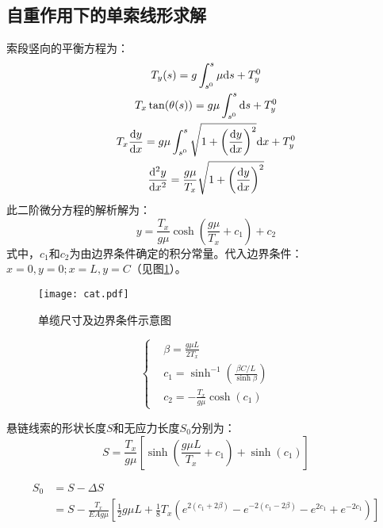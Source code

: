 \subsection{自重作用下的单索线形求解}
索段竖向的平衡方程为：
\begin{gather}
  T_y(s) = g \int_{s^0}^{s} \mu \mathrm{d}s + T_y^0 \notag \\
  T_x \tan(\theta(s)) = g \mu \int_{s^0}^{s} \mathrm{d}s + T_y^0 \notag \\
  T_x \frac{\mathrm{d} y}{\mathrm{d} x} = g \mu \int_{s^0}^{s} \sqrt{1+\left(\frac{\mathrm{d} y}{\mathrm{d} x}\right)^2} \mathrm{d}x + T_y^0 \notag \\
  \frac{\mathrm{d}^2 y}{\mathrm{d} x^2} = \frac{g \mu}{T_x} \sqrt{1+\left(\frac{\mathrm{d} y}{\mathrm{d} x}\right)^2}
\end{gather}
此二阶微分方程的解析解为：
\begin{equation}
  y = \frac{T_x}{g \mu} \cosh \left( \frac{g \mu}{T_x} + c_1 \right)+c_2
\end{equation}
式中，$c_1$和$c_2$为由边界条件确定的积分常量。代入边界条件：$x=0,y=0;x=L,y=C$（见图\ref{fig:cat}）。

\begin{figure}[!htpb]
\centering
\texttt{[image: cat.pdf]}
\caption{单缆尺寸及边界条件示意图}
\label{fig:cat}
\end{figure}

\begin{equation}
  \left \{
    \begin{split}
      & \beta = \frac{g \mu L}{2 T_x}\\
      & c_1 = \sinh^{-1}\left(\frac{\beta C / L}{\sinh \beta}\right)\\
      & c_2 = -\frac{T_x}{g \mu} \cosh(c_1)
    \end{split}
  \right.
\end{equation}

悬链线索的形状长度$S$和无应力长度$S_0$分别为：
\begin{equation}
  S = \frac{T_x}{g\mu}\left[\sinh\left(\frac{g \mu L}{T_x}+c_1\right)+\sinh(c_1)\right]
\end{equation}

\begin{equation}
\begin{split}
  S_0 &= S-\Delta S \\
      &= S - \frac{T_x}{EA g \mu }\left[ \frac{1}{2} g \mu L + \frac{1}{8} T_x \left( e^{2(c_1+2\beta)} - e^{-2(c_1-2\beta)} -e^{2c_1} + e^{-2c_1} \right) \right]
\end{split}
\end{equation}

